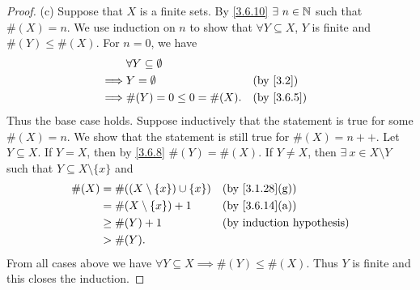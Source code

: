 \begin{proof}{(c)}
  Suppose that \(X\) is a finite sets.
  By \cref{3.6.10} \(\exists\ n \in \N\) such that \(\#(X) = n\).
  We use induction on \(n\) to show that \(\forall Y \subseteq X\), \(Y\) is finite and \(\#(Y) \leq \#(X)\).
  For \(n = 0\), we have
  \begin{align*}
             & \forall Y \subseteq \emptyset                               \\
    \implies & Y = \emptyset                 &  & \text{(by \cref{3.2})}   \\
    \implies & \#(Y) = 0 \leq 0 = \#(X).     &  & \text{(by \cref{3.6.5})}
  \end{align*}
  Thus the base case holds.
  Suppose inductively that the statement is true for some \(\#(X) = n\).
  We show that the statement is still true for \(\#(X) = n++\).
  Let \(Y \subseteq X\).
  If \(Y = X\), then by \cref{3.6.8} \(\#(Y) = \#(X)\).
  If \(Y \neq X\), then \(\exists\ x \in X \setminus Y\) such that \(Y \subseteq X \setminus \{x\}\) and
  \begin{align*}
    \#(X) & = \#((X \setminus \{x\}) \cup \{x\}) &  & \text{(by \cref{3.1.28}(g))}     \\
          & = \#(X \setminus \{x\}) + 1          &  & \text{(by \cref{3.6.14}(a))}     \\
          & \geq \#(Y) + 1                       &  & \text{(by induction hypothesis)} \\
          & > \#(Y).
  \end{align*}
  From all cases above we have \(\forall Y \subseteq X \implies \#(Y) \leq \#(X)\).
  Thus \(Y\) is finite and this closes the induction.


\end{proof}
